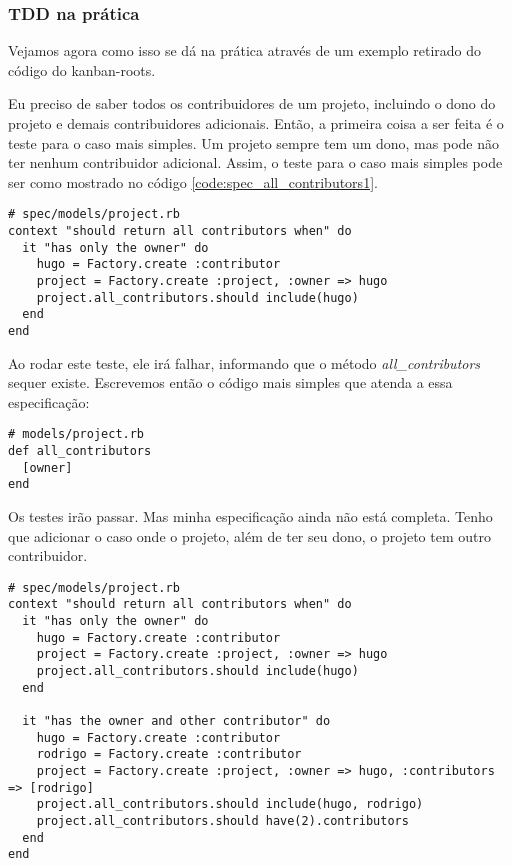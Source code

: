 \subsubsection{TDD na prática}
\label{ssub:tdd_na_pratica}

Vejamos agora como isso se dá na prática através de um exemplo retirado do código do kanban-roots.

Eu preciso de saber todos os contribuidores de um projeto, incluindo o dono do projeto e demais contribuidores adicionais. Então, a primeira coisa a ser feita é o teste para o caso mais simples. Um projeto sempre tem um dono, mas pode não ter nenhum contribuidor adicional. Assim, o teste para o caso mais simples pode ser como mostrado no código \ref{code:spec_all_contributors1}.

\begin{lstlisting}[caption=Expectativa para todos contribuidores de um projeto,label=code:spec_all_contributors1]
# spec/models/project.rb
context "should return all contributors when" do
  it "has only the owner" do
    hugo = Factory.create :contributor
    project = Factory.create :project, :owner => hugo
    project.all_contributors.should include(hugo)
  end
end
\end{lstlisting}

Ao rodar este teste, ele irá falhar, informando que o método \textit{all\_contributors} sequer existe. Escrevemos então o código mais simples que atenda a essa especificação:

\begin{lstlisting}[caption=Implementação para todos contribuidores de um projeto,label=code:implement_all_contributors1]
# models/project.rb
def all_contributors
  [owner]
end
\end{lstlisting}

Os testes irão passar. Mas minha especificação ainda não está completa. Tenho que adicionar o caso onde o projeto, além de ter seu dono, o projeto tem outro contribuidor.

\begin{lstlisting}[caption=Expectativa para todos contribuidores de um projeto,label=code:spec_all_contributors2]
# spec/models/project.rb
context "should return all contributors when" do
  it "has only the owner" do
    hugo = Factory.create :contributor
    project = Factory.create :project, :owner => hugo
    project.all_contributors.should include(hugo)
  end

  it "has the owner and other contributor" do
    hugo = Factory.create :contributor
    rodrigo = Factory.create :contributor
    project = Factory.create :project, :owner => hugo, :contributors => [rodrigo]
    project.all_contributors.should include(hugo, rodrigo)
    project.all_contributors.should have(2).contributors
  end
end
\end{lstlisting}

